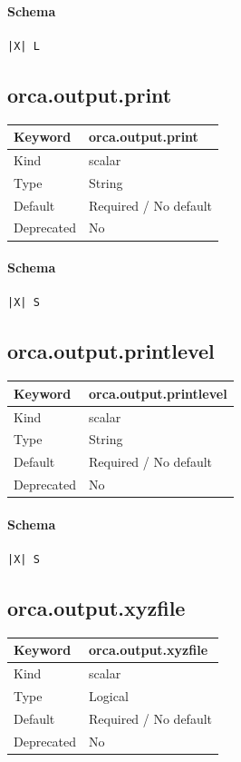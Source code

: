 \documentclass[11pt]{article}
\begin{document}
{{{{{\paragraph{Schema}
\begin{Verbatim}
|X| L
\end{Verbatim}

\subsection{orca.output.print}
\label{kw:orca-output-print}
\begin{longtable}{|p{1.5in}|p{4.5in}|}
\hline
Keyword & orca.output.print \\
\hline
Kind & scalar \\
\hline
Type & String \\
\hline
Default & Required / No default \\
\hline
Deprecated & No \\
\hline
\end{longtable}
\paragraph{Schema}
\begin{Verbatim}
|X| S
\end{Verbatim}

\subsection{orca.output.printlevel}
\label{kw:orca-output-printlevel}
\begin{longtable}{|p{1.5in}|p{4.5in}|}
\hline
Keyword & orca.output.printlevel \\
\hline
Kind & scalar \\
\hline
Type & String \\
\hline
Default & Required / No default \\
\hline
Deprecated & No \\
\hline
\end{longtable}
\paragraph{Schema}
\begin{Verbatim}
|X| S
\end{Verbatim}

\subsection{orca.output.xyzfile}
\label{kw:orca-output-xyzfile}
\begin{longtable}{|p{1.5in}|p{4.5in}|}
\hline
Keyword & orca.output.xyzfile \\
\hline
Kind & scalar \\
\hline
Type & Logical \\
\hline
Default & Required / No default \\
\hline
Deprecated & No \\
\hline
\end{longtable}
}}}}}
\end{document}
